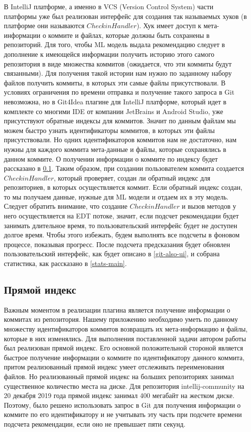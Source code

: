 В IntelliJ платформе, а именно в VCS (Version Control System) части платформы уже был реализован интерфейс для создания так называемых хуков (в платформе они называются $CheckinHandler$). Хук имеет доступ к мета-информации о коммите и файлах, которые должны быть сохранены в репозиторий. Для того, чтобы ML модель выдала рекомендацию следует в дополнение к имеющейся информации получить историю этого самого репозитория в виде множества коммитов (ожидается, что эти коммиты будут связанными). Для получения такой истории нам нужно по заданному набору файлов получить коммиты, в которых эти самые файлы присутствовали. В условиях ограничения по времени отправка и получение такого запроса в Git невозможна, но в Git4Idea плагине для IntelliJ платформе, который идет в комплекте со многими IDE от компании JetBrains и Android Studio, уже присутствуют обратные индексы для коммитов. Значит по данным файлам мы можем быстро узнать идентификаторы коммитов, в которых эти файлы присутствовали. Но одних идентификаторов коммитов нам не достаточно, нам нужны для каждого коммита мета-данные и файлы, которые сохранялись в данном коммите. О получении информации о коммите по индексу будет рассказано в \ref{forward-index}. Таким образом, при создании пользователем коммита создается $CheckinHandler$, который проверяет, создан ли обратный индекс для репозиториев, в которых осуществляется коммит. Если обратный индекс создан, то мы получаем данные, нужные для ML модели и отдаем их в эту модель. Следует обратить внимание, что создание $CheckinHandler$ и вызов методов у него осуществляется на EDT потоке, значит, если подсчет рекомендации будет занимать длительное время, то пользовательский интерфейс будет не доступен долгое время. Чтобы этого избежать, будем выполнять все подсчеты в фоновом процессе, показывая прогресс. После подсчета предсказания будет обновлен пользовательский интерфейс, как будет описано в \ref{git-also-ui}, и собрана статистика, как рассказано в \ref{stats-main}.
\subsection{Прямой индекс}\label{forward-index}
Важным моментом в реализации плагина является получение информации о коммитах из репозитория. Нашему приложению необходимо уметь по данному множеству идентификаторов коммитов возвращать их мета-информацию и файлы, которые в них изменялись. Для выполнения поставленной задачи автором работы был реализован прямой индекс. Его основной положительной стороной является быстрое получение информации о коммите по идентификатору данного коммита, притом реализованный прямой индекс умеет отслеживать переименования файлов. Но реализованный прямой индекс на больших репозиториях занимал существенное количество места на диске. Для репозитория intellij-community на 20 декабря 2019 года прямой индекс занимал 400 мегабайт на жестком диске. Поэтому, было решено использовать запрос в Git для получения информации о коммите по его идентификатору и не учитывать эту часть при подсчете времени подсчета рекомендации, если оно не превышает пяти секунд.
